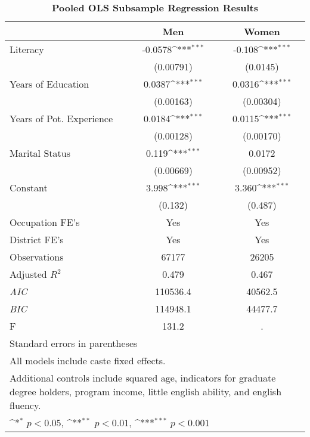 \begin{table}[!htbp]\centering
\def\sym#1{\ifmmode^{#1}\else\(^{#1}\)\fi}
\caption{\textbf{Pooled OLS Subsample Regression Results}}
\small\begin{tabular}{@{\hskip\tabcolsep\extracolsep\fill}l*{2}{c}}
\toprule
                &\multicolumn{1}{c}{Men}&\multicolumn{1}{c}{Women}\\
\midrule
Literacy        &  -0.0578\sym{***}&   -0.108\sym{***}\\
                &(0.00791)         & (0.0145)         \\
\addlinespace
Years of Education&   0.0387\sym{***}&   0.0316\sym{***}\\
                &(0.00163)         &(0.00304)         \\
\addlinespace
Years of Pot. Experience&   0.0184\sym{***}&   0.0115\sym{***}\\
                &(0.00128)         &(0.00170)         \\
\addlinespace
Marital Status  &    0.119\sym{***}&   0.0172         \\
                &(0.00669)         &(0.00952)         \\
\addlinespace
Constant        &    3.998\sym{***}&    3.360\sym{***}\\
                &  (0.132)         &  (0.487)         \\
\addlinespace
Occupation FE's &      Yes         &      Yes         \\
\addlinespace
District FE's   &      Yes         &      Yes         \\
\midrule
Observations    &    67177         &    26205         \\
Adjusted \(R^{2}\)&    0.479         &    0.467         \\
\textit{AIC}    & 110536.4         &  40562.5         \\
\textit{BIC}    & 114948.1         &  44477.7         \\
F               &    131.2         &        .         \\
\bottomrule
\multicolumn{3}{p{\linewidth}}{\footnotesize Standard errors in parentheses}\\
\multicolumn{3}{p{\linewidth}}{\footnotesize All models include caste fixed effects.}\\
\multicolumn{3}{p{\linewidth}}{\footnotesize Additional controls include squared age, indicators for graduate degree holders, program income, little english ability, and english fluency.}\\
\multicolumn{3}{p{\linewidth}}{\footnotesize \sym{*} \(p<0.05\), \sym{**} \(p<0.01\), \sym{***} \(p<0.001\)}\\
\end{tabular}
\end{table}
